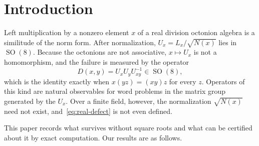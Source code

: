 \documentclass[11pt]{amsart}
\theoremstyle{definition}
\theoremstyle{remark}
\DeclareMathOperator{\SO}{SO}
\begin{document}

\maketitle

\section{Introduction}\label{sec:intro}

Left multiplication by a nonzero element $x$ of a real division octonion
algebra is a similitude of the norm form. After normalization,
$U_x=L_x/\sqrt{N(x)}$ lies in $\SO(8)$. Because the octonions are not
associative, $x\mapsto U_x$ is not a homomorphism, and the failure is measured
by the operator
\begin{equation}\label{eq:real-defect}
  D(x,y)=U_xU_yU_{xy}^{-1}\in\SO(8),
\end{equation}
which is the identity exactly when $x(yz)=(xy)z$ for every $z$. Operators of
this kind are natural observables for word problems in the matrix group
generated by the $U_x$. Over a finite field, however, the normalization
$\sqrt{N(x)}$ need not exist, and~\eqref{eq:real-defect} is not even defined.

This paper records what survives without square roots and what can be
certified about it by exact computation. Our results are as follows.
\end{document}
